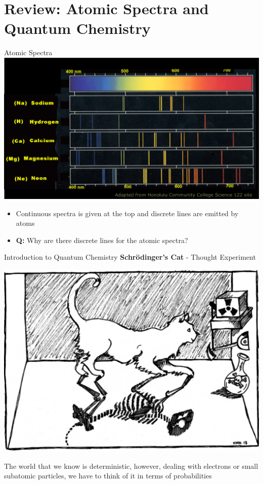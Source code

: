 \documentclass[11pt]{beamer}
\begin{document}
\section{Review: Atomic Spectra and Quantum Chemistry}

\begin{frame}{Atomic Spectra}
  \centering
  \includegraphics[width=0.85\linewidth]{cont_line}
  \begin{itemize}
  \item Continuous spectra is given at the top and
    discrete lines are emitted by atoms
  \item \textbf{Q:} Why are there discrete lines for
    the atomic spectra?
  \end{itemize}
\end{frame}

\begin{frame}{Introduction to Quantum Chemistry}
  \textbf{Schr\"{o}dinger's Cat} - Thought Experiment
  \begin{center}
    \includegraphics[width=0.65\linewidth]{schor_cat}
  \end{center}

  The world that we know is deterministic, however, dealing
  with electrons or small subatomic particles, we have to think
  of it in terms of probabilities
\end{frame}
\end{document}
